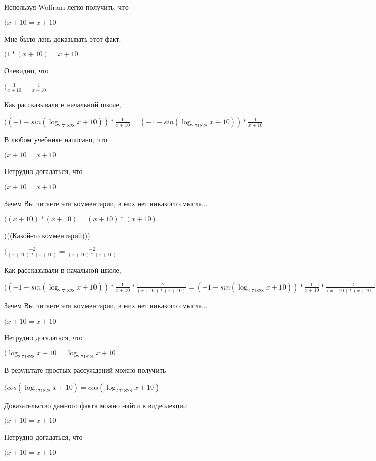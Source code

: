 \documentclass[12pt,a4paper,fleqn]{article}
\theoremstyle{definition}
\begin{document}
Используя Wolfram легко получить, что

$( x  +  10  =  x  +  10 $

Мне было лень доказывать этот факт.

$( 1  * ( x  +  10 ) =  x  +  10 $

Очевидно, что

$(\frac{ 1 }{ x  +  10 }
 = \frac{ 1 }{ x  +  10 }
$

Как рассказывали в начальной школе,

$(( -1  - sin(\log_{ 2.71828 }{ x  +  10 })) * \frac{ 1 }{ x  +  10 }
 = ( -1  - sin(\log_{ 2.71828 }{ x  +  10 })) * \frac{ 1 }{ x  +  10 }
$

В любом учебнике написано, что

$( x  +  10  =  x  +  10 $

Нетрудно догадаться, что

$( x  +  10  =  x  +  10 $

Зачем Вы читаете эти комментарии, в них нет никакого смысла...

$(( x  +  10 ) * ( x  +  10 ) = ( x  +  10 ) * ( x  +  10 )$

(((Какой-то комментарий)))

$(\frac{ -2 }{( x  +  10 ) * ( x  +  10 )}
 = \frac{ -2 }{( x  +  10 ) * ( x  +  10 )}
$

Как рассказывали в начальной школе,

$(( -1  - sin(\log_{ 2.71828 }{ x  +  10 })) * \frac{ 1 }{ x  +  10 }
 * \frac{ -2 }{( x  +  10 ) * ( x  +  10 )}
 = ( -1  - sin(\log_{ 2.71828 }{ x  +  10 })) * \frac{ 1 }{ x  +  10 }
 * \frac{ -2 }{( x  +  10 ) * ( x  +  10 )}
$

Зачем Вы читаете эти комментарии, в них нет никакого смысла...

$( x  +  10  =  x  +  10 $

Нетрудно догадаться, что

$(\log_{ 2.71828 }{ x  +  10 } = \log_{ 2.71828 }{ x  +  10 }$

В результате простых рассуждений можно получить

$(cos(\log_{ 2.71828 }{ x  +  10 }) = cos(\log_{ 2.71828 }{ x  +  10 })$

Доказательство данного факта можно найти в \href{https://www.youtube.com/watch?v=dQw4w9WgXcQ}{видеолекции}

$( x  +  10  =  x  +  10 $

Нетрудно догадаться, что

$( x  +  10  =  x  +  10 $
\end{document}

